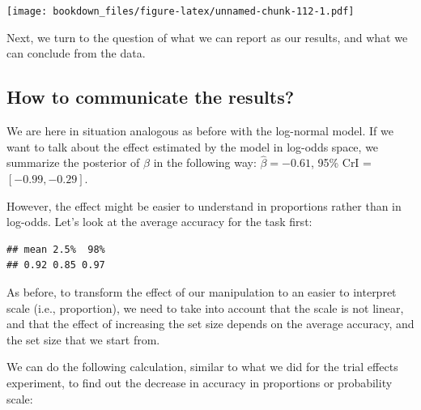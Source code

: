 \documentclass[12pt,]{krantz}
\newenvironment{Shaded}{\begin{snugshade}}{\end{snugshade}}
\newcommand{\DataTypeTok}[1]{\textcolor[rgb]{0.13,0.29,0.53}{#1}}
\newcommand{\DecValTok}[1]{\textcolor[rgb]{0.00,0.00,0.81}{#1}}
\newcommand{\KeywordTok}[1]{\textcolor[rgb]{0.13,0.29,0.53}{\textbf{#1}}}
\newcommand{\NormalTok}[1]{#1}
\newcommand{\OperatorTok}[1]{\textcolor[rgb]{0.81,0.36,0.00}{\textbf{#1}}}
\newcommand{\StringTok}[1]{\textcolor[rgb]{0.31,0.60,0.02}{#1}}
\theoremstyle{definition}
\theoremstyle{definition}
\theoremstyle{definition}
\theoremstyle{remark}
\begin{document}
\texttt{[image: bookdown\_files/figure-latex/unnamed-chunk-112-1.pdf]}

Next, we turn to the question of what we can report as our results, and what we can conclude from the data.

\hypertarget{how-to-communicate-the-results-2}{%
\subsection{How to communicate the results?}\label{how-to-communicate-the-results-2}}

We are here in situation analogous as before with the log-normal model. If we want to talk about the effect estimated by the model in log-odds space, we summarize the posterior of \(\beta\) in the following way: \(\hat\beta = -0.61\), 95\% CrI = \([ -0.99 , -0.29 ]\).

However, the effect might be easier to understand in proportions rather than in log-odds. Let's look at the average accuracy for the task first:

\begin{Shaded}
\end{Shaded}

\begin{verbatim}
## mean 2.5%  98% 
## 0.92 0.85 0.97
\end{verbatim}

As before, to transform the effect of our manipulation to an easier to interpret scale (i.e., proportion), we need to take into account that the scale is not linear, and that the effect of increasing the set size depends on the average accuracy, and the set size that we start from.

We can do the following calculation, similar to what we did for the trial effects experiment, to find out the decrease in accuracy in proportions or probability scale:

\begin{Shaded}
\end{Shaded}
\end{document}
